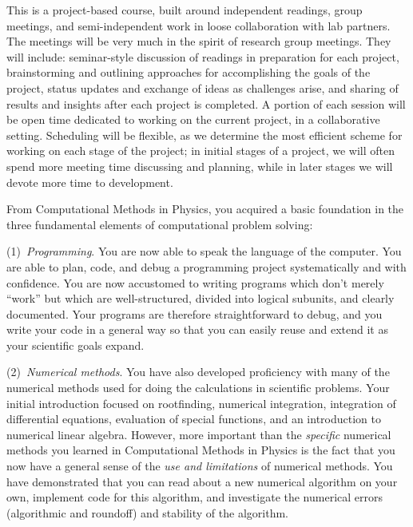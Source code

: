 \documentclass[12pt]{mcplain}
\begin{document}


This is a project-based course, built around independent readings, group
meetings, and semi-independent work in loose collaboration with lab partners.
The meetings will be very much in the spirit of research group meetings.  They
will include: seminar-style discussion of readings in preparation for each
project, brainstorming and outlining approaches for accomplishing the goals of
the project, status updates and exchange of ideas as challenges arise, and
sharing of results and insights after each project is completed.  A portion of
each session will be open time dedicated to working on the current project, in a
collaborative setting.  Scheduling will be flexible, as we determine the most
efficient scheme for working on each stage of the project; in initial stages of
a project, we will often spend more meeting time discussing and planning, while
in later stages we will devote more time to development.

\clearpage


From Computational Methods in Physics, you acquired a basic foundation in the
three fundamental elements of computational problem solving:

(1)~\textit{Programming}. You are now able to speak the language of the
computer.  You are able to plan, code, and debug a programming project
systematically and with confidence.  You are now accustomed to writing programs
which don't merely ``work'' but which are well-structured, divided into logical
subunits, and clearly documented.  Your programs are therefore straightforward
to debug, and you write your code in a general way so that you can easily reuse
and extend it as your scientific goals expand.

(2)~\textit{Numerical methods}.  You have also developed proficiency with many
of the numerical methods used for doing the calculations in scientific problems.
Your initial introduction focused on rootfinding, numerical integration,
integration of differential equations, evaluation of special functions, and an
introduction to numerical linear algebra.  However, more important than the
\textit{specific} numerical methods you learned in Computational Methods in
Physics is the fact that you now have a general sense of the \textit{use and
limitations} of numerical methods.  You have demonstrated that you can read
about a new numerical algorithm on your own, implement code for this algorithm,
and investigate the numerical errors (algorithmic and roundoff) and stability of
the algorithm.
\end{document}
